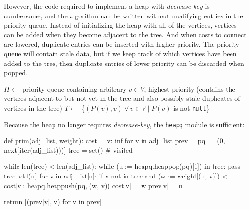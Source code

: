 \documentclass[12pt, titlepage]{article}
\begin{document}
However, the code required to implement a heap with \textit{decrease-key} is cumbersome, and the algorithm can be written without modifying entries in the priority queue. Instead of initializing the heap with all of the vertices, vertices can be added when they become adjacent to the tree. And when costs to connect are lowered, duplicate entries can be inserted with higher priority. The priority queue will contain stale data, but if we keep track of which vertices have been added to the tree, then duplicate entries of lower priority can be discarded when popped. \\

\begin{algorithm}[H]
  \SetAlgoLined
  \DontPrintSemicolon
  $H \longleftarrow$\hspace{0.5mm} priority queue containing arbitrary $v\in V$, highest priority\;
  \hspace{13mm}(contains the vertices adjacent to but not yet in the tree and\;
  \hspace{13mm}also possibly stale duplicates of vertices in the tree)\;
  $T \longleftarrow$\hspace{0.5mm} \{$(P(v), v)\;\forall\,v\in V\mid P(v)$ is not \texttt{null}\}\;
  \;
    \caption{Prim's Algorithm (heap with duplicate entries)}
\end{algorithm} \medskip

Because the heap no longer requires \textit{decrease-key}, the \texttt{heapq} module is sufficient: \medskip

\begin{python}
def prim(adj_list, weight):
    cost = {v: inf for v in adj_list}
    prev = {}
    pq = [(0, next(iter(adj_list)))]
    tree = set()  # visited

    while len(tree) < len(adj_list):
        while (u := heapq.heappop(pq)[1]) in tree: pass
        tree.add(u)
        for v in adj_list[u]:
            if v not in tree and (w := weight[(u, v)]) < cost[v]:
                heapq.heappush(pq, (w, v))
                cost[v] = w
                prev[v] = u
        
    return [(prev[v], v) for v in prev]
\end{python}
\end{document}
